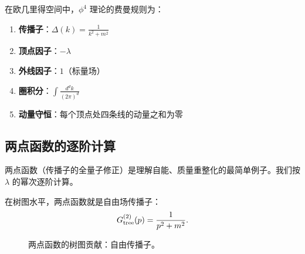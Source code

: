 \begin{property}
在欧几里得空间中，$\phi^4$ 理论的费曼规则为：
\begin{enumerate}
    \item \textbf{传播子}：$\displaystyle \Delta(k) = \frac{1}{k^2 + m^2}$
    \item \textbf{顶点因子}：$-\lambda$
    \item \textbf{外线因子}：$1$（标量场）
    \item \textbf{圈积分}：$\displaystyle \int \frac{d^d k}{(2\pi)^d}$
    \item \textbf{动量守恒}：每个顶点处四条线的动量之和为零
\end{enumerate}
\end{property}


\subsection{两点函数的逐阶计算}

两点函数（传播子的全量子修正）是理解自能、质量重整化的最简单例子。我们按 $\lambda$ 的幂次逐阶计算。

\begin{example}
在树图水平，两点函数就是自由场传播子：
\begin{equation}
    G^{(2)}_{\rm tree}(p) = \frac{1}{p^2 + m^2}.
\end{equation}
\begin{figure}[htbp]
\centering
{}
\caption{两点函数的树图贡献：自由传播子。}
\label{fig:phi4_2pt_tree}
\end{figure}
\end{example}

